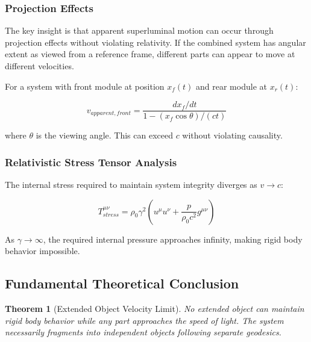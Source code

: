 \documentclass[11pt,a4paper]{article}
\newtheorem{theorem}{Theorem}[section]
\theoremstyle{remark}
\begin{document}
\subsubsection{Projection Effects}

The key insight is that apparent superluminal motion can occur through projection effects without violating relativity. If the combined system has angular extent as viewed from a reference frame, different parts can appear to move at different velocities.

For a system with front module at position $x_f(t)$ and rear module at $x_r(t)$:

\begin{equation}
v_{apparent,front} = \frac{dx_f/dt}{1 - (x_f \cos\theta)/(ct)}
\label{eq:apparent_velocity}
\end{equation}

where $\theta$ is the viewing angle. This can exceed $c$ without violating causality.

\subsubsection{Relativistic Stress Tensor Analysis}

The internal stress required to maintain system integrity diverges as $v \to c$:

\begin{equation}
T^{\mu\nu}_{stress} = \rho_0 \gamma^2 \left(u^\mu u^\nu + \frac{p}{\rho_0 c^2} g^{\mu\nu}\right)
\label{eq:stress_tensor}
\end{equation}

As $\gamma \to \infty$, the required internal pressure approaches infinity, making rigid body behavior impossible.

\subsection{Fundamental Theoretical Conclusion}

\begin{theorem}[Extended Object Velocity Limit]
No extended object can maintain rigid body behavior while any part approaches the speed of light. The system necessarily fragments into independent objects following separate geodesics.
\end{theorem}
\end{document}
